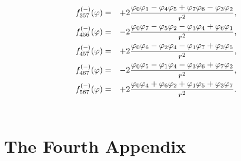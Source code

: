 \documentclass[a4paper,12pt]{book}
\begin{document}
\begin{eqnarray}
{\quad {f}_{357}^{(-)}{(\varphi )}} &=&+2{\frac{{\varphi _{0}}{\varphi _{1}}-%
{\varphi _{4}}{\varphi _{5}}+{\varphi _{7}}{\varphi _{6}}-{\varphi _{3}}{%
\varphi _{2}}}{r^{2}},}  \nonumber \\
{{f}_{456}^{(-)}{(\varphi )}} &=&-2{\frac{{\varphi _{0}}{\varphi _{7}}-{%
\varphi _{5}}{\varphi _{2}}-{\varphi _{3}}{\varphi _{4}}+{\varphi
_{6}\varphi _{1}}}{r^{2}},}  \nonumber \\
{\quad {f}_{457}^{(-)}{(\varphi )}} &=&+2{\frac{{\varphi _{0}}{\varphi _{6}}-%
{\varphi _{2}}{\varphi _{4}}-{\varphi _{1}}{\varphi _{7}}+{\varphi _{3}}{%
\varphi _{5}}}{r^{2}},}  \nonumber \\
{{f}_{467}^{(-)}{(\varphi )}} &=&-2{\frac{{\varphi _{0}}{\varphi _{5}}-{%
\varphi _{1}}{\varphi _{4}}-{\varphi _{3}}{\varphi _{6}}+{\varphi
_{7}\varphi _{2}}}{r^{2}},}  \nonumber \\
{\quad {f}_{567}^{(-)}{(\varphi )}} &=&+2{\frac{{\varphi _{0}}{\varphi _{4}}+%
{\varphi _{6}}{\varphi _{2}}+{\varphi _{1}}{\varphi _{5}}+{\varphi _{3}}{%
\varphi _{7}}}{r^{2}}.}  \nonumber \\
&&
\end{eqnarray}

\newpage

\chapter{The Fourth Appendix}

\end{document}
